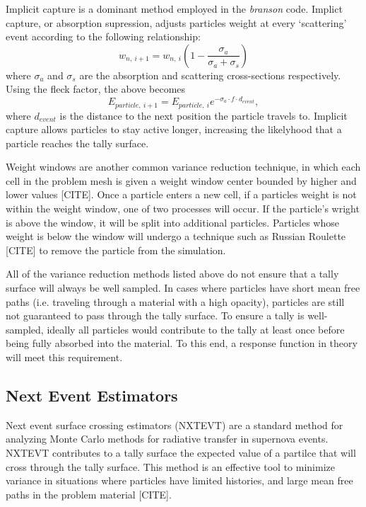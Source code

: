 \documentclass[]{article}
\begin{document}
		Implicit capture is a dominant method employed in the \textit{branson} code. Implict capture, or absorption supression, adjusts particles weight at every `scattering' event according to the following relationship:
		\begin{equation}
			w_{n,~i+1} = w_{n,~i}(1 - \frac{\sigma_{a}}{\sigma_{a} + \sigma_{s}})
		\end{equation}
		where $\sigma_{a}$ and $\sigma_{s}$ are the absorption and scattering cross-sections respectively. Using the fleck factor, the above becomes 
		\begin{equation}
			E_{particle,~i+1} = E_{particle,~i}e^{-\sigma_{a} \cdot f \cdot d_{event}},
		\end{equation}
		where $d_{event}$ is the distance to the next position the particle travels to. Implicit capture allows particles to stay active longer, increasing the likelyhood that a particle reaches the tally surface. 
		
		Weight windows are another common variance reduction technique, in which each cell in the problem mesh is given a weight window center bounded by higher and lower values [CITE]. Once a particle enters a new cell, if a particles weight is not within the weight window, one of two processes will occur. If the particle's wright is above the window, it will be split into additional particles. Particles whose weight is below the window will undergo a technique such as Russian Roulette [CITE] to remove the particle from the simulation.  
		
		All of the variance reduction methods listed above do not ensure that a tally surface will always be well sampled. In cases where particles have short mean free paths (i.e. traveling through a material with a high opacity), particles are still not guaranteed to pass through the tally surface. To ensure a tally is  well-sampled, ideally all particles would contribute to the tally at least once before being fully absorbed into the material. To this end, a response function in theory will meet this requirement. 
		
	\subsection{Next Event Estimators}
		Next event surface crossing estimators (NXTEVT) are a standard method for analyzing Monte Carlo methods for radiative transfer in supernova events. NXTEVT contributes to a tally surface the expected value of a partilce that will cross through the tally surface. This method is an effective tool to minimize variance in situations where particles have limited histories, and large mean free paths in the problem material [CITE]. 
		
\end{document}
